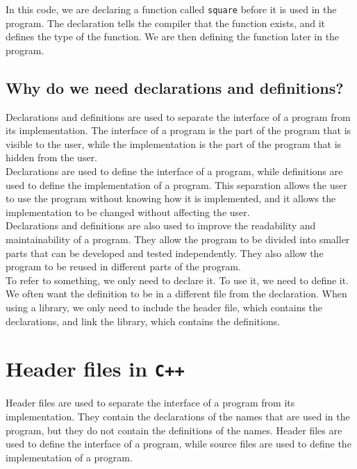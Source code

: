 In this code, we are declaring a function called \texttt{square} before it is used in the program. The declaration tells the
compiler that the function exists, and it defines the type of the function. We are then defining the function later in the
program.\\

\subsection{Why do we need declarations and definitions?}

Declarations and definitions are used to separate the interface of a program from its implementation. The interface of a program
is the part of the program that is visible to the user, while the implementation is the part of the program that is hidden from
the user.\\

Declarations are used to define the interface of a program, while definitions are used to define the implementation of a program.
This separation allows the user to use the program without knowing how it is implemented, and it allows the implementation to
be changed without affecting the user.\\

Declarations and definitions are also used to improve the readability and maintainability of a program. They allow the program
to be divided into smaller parts that can be developed and tested independently. They also allow the program to be reused in
different parts of the program.\\

To refer to something, we only need to declare it. To use it, we need to define it. We often want the definition to be in a
different file from the declaration. When using a library, we only need to include the header file, which contains the
declarations, and link the library, which contains the definitions.\\

\section{Header files in \texttt{C++}}

Header files are used to separate the interface of a program from its implementation. They contain the declarations of the
names that are used in the program, but they do not contain the definitions of the names. Header files are used to define
the interface of a program, while source files are used to define the implementation of a program.\\

